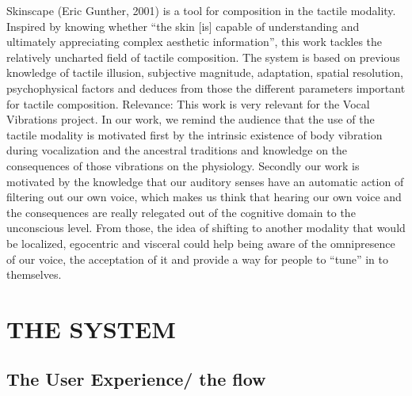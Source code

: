 \documentclass{nime-alternate}
\begin{document}
Skinscape (Eric Gunther, 2001) is a tool for composition in the tactile modality. Inspired by knowing whether “the skin [is] capable of understanding and ultimately appreciating complex aesthetic information”, this work tackles the relatively uncharted field of tactile composition. The system is based on previous knowledge of tactile illusion, subjective magnitude, adaptation, spatial resolution, psychophysical factors and deduces from those the different parameters important for tactile composition.
Relevance: This work is very relevant for the Vocal Vibrations project. In our work, we remind the audience that the use of the tactile modality is motivated first by the intrinsic existence of body vibration during vocalization and the ancestral traditions and knowledge on the consequences of those vibrations on the physiology. Secondly our work is motivated by the knowledge that our auditory senses have an automatic action of filtering out our own voice, which makes us think that hearing our own voice and the consequences are really relegated out of the cognitive domain to the unconscious level. From those, the idea of shifting to another modality that would be localized, egocentric and visceral could help being aware of the omnipresence of our voice, the acceptation of it and provide a way for people to “tune” in to themselves.

\section{THE SYSTEM}

\subsection{The User Experience/ the flow}
\end{document}
